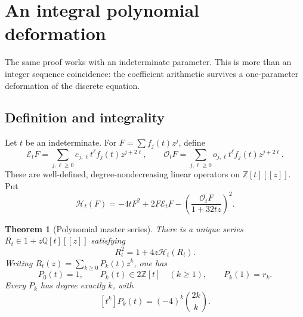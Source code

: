 \documentclass[11pt,a4paper]{article}
\numberwithin{equation}{section}
\newtheorem{theorem}{Theorem}[section]
\theoremstyle{definition}
\theoremstyle{remark}
\theoremstyle{definition}
\newcommand{\Z}{\mathbb Z}
\newcommand{\Q}{\mathbb Q}
\newcommand{\Eop}{\mathcal E}
\newcommand{\Oop}{\mathcal O}
\newcommand{\Hop}{\mathcal H}
\begin{document}
\section{An integral polynomial deformation}
\label{bgg:sec:polynomials}

The same proof works with an indeterminate parameter. This is more than an
integer sequence coincidence: the coefficient arithmetic survives a
one-parameter deformation of the discrete equation.

\subsection{Definition and integrality}

Let $t$ be an indeterminate. For $F=\sum f_j(t)z^j$, define
\begin{equation}\label{bgg:eq:parameter-operators}
 \Eop_tF=\sum_{j,\ell\ge0}e_{j,\ell}t^\ell f_j(t)z^{j+2\ell},\qquad
 \Oop_tF=\sum_{j,\ell\ge0}o_{j,\ell}t^\ell f_j(t)z^{j+2\ell}.
\end{equation}
These are well-defined, degree-nondecreasing linear operators on
$\Z[t][[z]]$. Put
\begin{equation}\label{bgg:eq:H-parameter}
 \Hop_t(F)=-4tF^2+2F\Eop_tF
          -\left(\frac{\Oop_tF}{1+32tz}\right)^2.
\end{equation}

\begin{theorem}[Polynomial master series]\label{bgg:thm:polynomial-integrality}
There is a unique series $R_t\in1+z\Q[t][[z]]$ satisfying
\begin{equation}\label{bgg:eq:parameter-master}
 R_t^2=1+4z\Hop_t(R_t).
\end{equation}
Writing $R_t(z)=\sum_{k\ge0}P_k(t)z^k$, one has
\begin{equation}\label{bgg:eq:polynomial-integrality}
 P_0(t)=1,\qquad P_k(t)\in2\Z[t]\quad(k\ge1),\qquad P_k(1)=r_k.
\end{equation}
Every $P_k$ has degree exactly $k$, with
\begin{equation}\label{bgg:eq:leading-polynomial}
 [t^k]P_k(t)=(-4)^k\binom{2k}{k}.
\end{equation}
\end{theorem}
\end{document}
